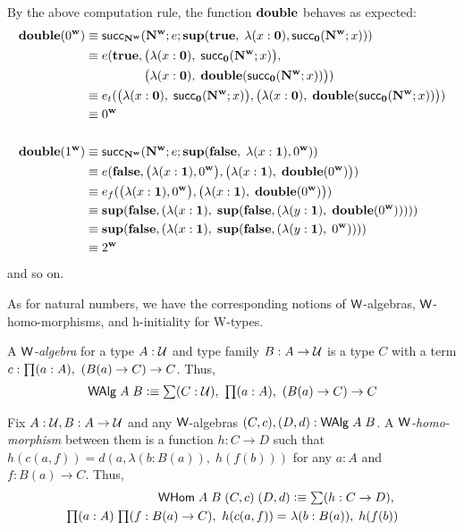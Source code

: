 By the above computation rule, the function $\mathbf{double}$ behaves as expected:
\begin{align*}
\mathbf{double}(0^\mathbf{w}) & \equiv \mathsf{succ}_\mathbf{N^w}(\mathbf{N^w}; e; \mathbf{sup}(\mathbf{true}, \; \lambda(x : \mathbf{0}), \mathsf{succ}_\mathbf{0}(\mathbf{N^w};x))) \\
& \equiv e(\mathbf{true}, \big(\lambda(x : \mathbf{0}), \; \mathsf{succ}_\mathbf{0}(\mathbf{N^w};x)\big), \\
 & \;\;\;\;\;\;\;\;\;\;\;\;\;\;\;\;\; \big(\lambda(x : \mathbf{0}), \; \mathbf{double}(\mathsf{succ}_\mathbf{0}(\mathbf{N^w};x))\big)) \\
 & \equiv e_t(\big(\lambda(x : \mathbf{0}), \; \mathsf{succ}_\mathbf{0}(\mathbf{N^w};x)\big), \big(\lambda(x : \mathbf{0}), \; \mathbf{double}(\mathsf{succ}_\mathbf{0}(\mathbf{N^w};x))\big)) \\
 & \equiv 0^\mathbf{w} \\
 \\
\mathbf{double}(1^\mathbf{w}) & \equiv \mathsf{succ}_\mathbf{N^w}(\mathbf{N^w}; e; \mathbf{sup}(\mathbf{false}, \; \lambda(x : \mathbf{1}), 0^\mathbf{w})) \\
& \equiv e(\mathbf{false}, \big(\lambda(x : \mathbf{1}), 0^\mathbf{w}\big), \big(\lambda(x : \mathbf{1}), \; \mathbf{double}(0^\mathbf{w})\big)) \\
 & \equiv e_f(\big(\lambda(x : \mathbf{1}), 0^\mathbf{w}\big), \big(\lambda(x : \mathbf{1}), \; \mathbf{double}(0^\mathbf{w})\big)) \\
 & \equiv \mathbf{sup}(\mathbf{false}, (\lambda (x:\mathbf{1}), \; \mathbf{sup}(\mathbf{false},(\lambda (y : \mathbf{1}), \; \mathbf{double}(0^\mathbf{w}))))) \\
 & \equiv \mathbf{sup}(\mathbf{false}, (\lambda (x:\mathbf{1}), \; \mathbf{sup}(\mathbf{false},(\lambda (y : \mathbf{1}), \; 0^\mathbf{w})))) \\
 & \equiv 2^\mathbf{w}
\end{align*}
and so on.

\medskip

As for natural numbers, we have the corresponding notions of $\mathsf{W}$-algebras, $\mathsf{W}$-homo-morphisms, and h-initiality for W-types.
\begin{defn}
A \emph{$\mathsf{W}$-algebra} for a type $A : \mathcal{U}$ and type family $B : A \to \mathcal{U}$ is a type $C$ with a term $c : \prd{a:A} (B(a) \to C) \to C$. Thus,
\begin{align*}
\walg \; A \; B \defeq \sm {C : \type} \prd{a:A} (B(a) \to C) \to C
\end{align*}
\end{defn}

\begin{defn}
Fix $A : \mathcal{U}, B : A \to \mathcal{U}$ and any $\mathsf{W}$-algebras $(C,c),(D,d) : \mathsf{\mathsf{W} Alg} \; A \; B$. A \emph{$\mathsf{W}$-homo-morphism} between them is a function $h : C \to D$ such that $h(c(a,f)) = d(a,\lambda (b : B(a)), \; h(f(b)))$ for any $a : A$ and $f : B(a) \to C$. Thus,
\begin{align*}
\whom \; A \; B \; (C, c) \; (D,d) \defeq \sm {h : C \to D} \\ \prd{a:A}{f:B(a)\to C} \id{h(c(a,f))}{\lambda (b : B(a)), \; h(f(b))}
\end{align*}
\end{defn}

